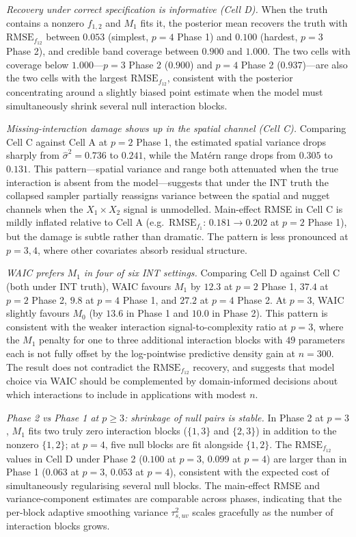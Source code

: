 \emph{Recovery under correct specification is informative (Cell D).}
When the truth contains a nonzero $f_{1,2}$ and $M_1$ fits it, the posterior mean recovers
the truth with $\mathrm{RMSE}_{f_{12}}$ between $0.053$ (simplest, $p=4$ Phase 1) and
$0.100$ (hardest, $p=3$ Phase 2), and credible band coverage between $0.900$ and $1.000$.
The two cells with coverage below $1.000$---$p=3$ Phase 2 ($0.900$) and $p=4$ Phase 2
($0.937$)---are also the two cells with the largest $\mathrm{RMSE}_{f_{12}}$, consistent
with the posterior concentrating around a slightly biased point estimate when the model
must simultaneously shrink several null interaction blocks.

\emph{Missing-interaction damage shows up in the spatial channel (Cell C).}
Comparing Cell C against Cell A at $p=2$ Phase 1, the estimated spatial variance drops
sharply from $\hat\sigma^2=0.736$ to $0.241$, while the Mat\'ern range drops from $0.305$
to $0.131$. This pattern---spatial variance and range both attenuated when the true
interaction is absent from the model---suggests that under the INT truth the collapsed
sampler partially reassigns variance between the spatial and nugget channels when the
$X_1\times X_2$ signal is unmodelled. Main-effect RMSE in Cell C is mildly inflated
relative to Cell A (e.g.\ $\mathrm{RMSE}_{f_1}$: $0.181\to 0.202$ at $p=2$ Phase 1), but
the damage is subtle rather than dramatic. The pattern is less pronounced at $p=3,4$,
where other covariates absorb residual structure.

\emph{WAIC prefers $M_1$ in four of six INT settings.}
Comparing Cell D against Cell C (both under INT truth), WAIC favours $M_1$ by
$12.3$ at $p=2$ Phase 1, $37.4$ at $p=2$ Phase 2, $9.8$ at $p=4$ Phase 1, and $27.2$ at
$p=4$ Phase 2. At $p=3$, WAIC slightly favours $M_0$ (by $13.6$ in Phase 1 and $10.0$ in
Phase 2). This pattern is consistent with the weaker interaction signal-to-complexity
ratio at $p=3$, where the $M_1$ penalty for one to three additional interaction blocks
with $49$ parameters each is not fully offset by the log-pointwise predictive density
gain at $n=300$. The result does not contradict the $\mathrm{RMSE}_{f_{12}}$ recovery, and
suggests that model choice via WAIC should be complemented by domain-informed decisions
about which interactions to include in applications with modest $n$.

\emph{Phase 2 vs Phase 1 at $p\ge 3$: shrinkage of null pairs is stable.}
In Phase 2 at $p=3$, $M_1$ fits two truly zero interaction blocks ($\{1,3\}$ and $\{2,3\}$)
in addition to the nonzero $\{1,2\}$; at $p=4$, five null blocks are fit alongside
$\{1,2\}$. The $\mathrm{RMSE}_{f_{12}}$ values in Cell D under Phase 2 ($0.100$ at $p=3$,
$0.099$ at $p=4$) are larger than in Phase 1 ($0.063$ at $p=3$, $0.053$ at $p=4$),
consistent with the expected cost of simultaneously regularising several null blocks. The
main-effect RMSE and variance-component estimates are comparable across phases, indicating
that the per-block adaptive smoothing variance $\tau^2_{s,uv}$ scales gracefully as the
number of interaction blocks grows.


